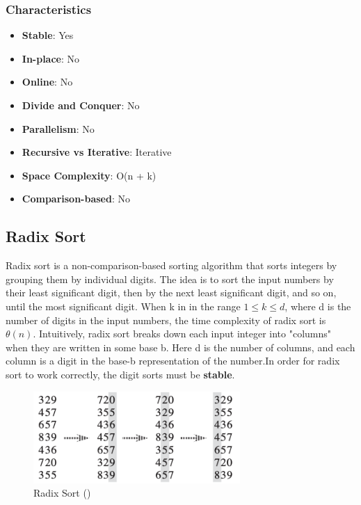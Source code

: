 \subsubsection*{Characteristics}

\begin{itemize}
    \item \textbf{Stable}: Yes
    \item \textbf{In-place}: No
    \item \textbf{Online}: No
    \item \textbf{Divide and Conquer}: No
    \item \textbf{Parallelism}: No
    \item \textbf{Recursive vs Iterative}: Iterative
    \item \textbf{Space Complexity}: O(n + k)
    \item \textbf{Comparison-based}: No
\end{itemize}

\subsection{Radix Sort}

Radix sort is a non-comparison-based sorting algorithm that sorts integers by grouping them by individual digits. The idea is to sort the input numbers by their least significant digit, then by the next least significant digit, and so on, until the most significant digit. When k in in the range $1 \leq k \leq d$, where d is the number of digits in the input numbers, the time complexity of radix sort is $\theta(n)$.
Intuitively, radix sort breaks down each input integer into "columns" when they are written in some base b. Here d is the number of columns, and each column is a digit in the base-b representation of the number.In order for radix sort to work correctly, the digit sorts must be \textbf{stable}.

\begin{figure}[H]
    \centering
    \includegraphics[width=0.7\textwidth]{assets/radixsort.png}
    \caption{Radix Sort (\cite{cormen2022introduction})}
\end{figure}

